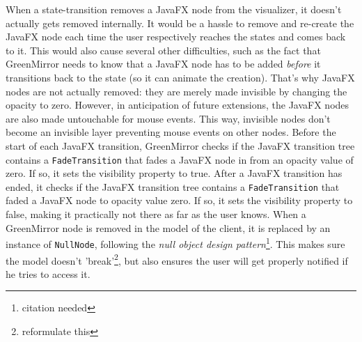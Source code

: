 \documentclass[a4paper]{article}
\begin{document}
	When a state-transition removes a JavaFX node from the visualizer, it doesn't actually gets removed internally. It would be a hassle to remove and re-create the JavaFX node each time the user respectively reaches the states and comes back to it. This would also cause several other difficulties, such as the fact that GreenMirror needs to know that a JavaFX node has to be added \emph{before} it transitions back to the state (so it can animate the creation). That's why JavaFX nodes are not actually removed: they are merely made invisible by changing the opacity to zero. However, in anticipation of future extensions, the JavaFX nodes are also made untouchable for mouse events. This way, invisible nodes don't become an invisible layer preventing mouse events on other nodes. Before the start of each JavaFX transition, GreenMirror checks if the JavaFX transition tree contains a \lstinline{FadeTransition} that fades a JavaFX node in from an opacity value of zero. If so, it sets the visibility property to true. After a JavaFX transition has ended, it checks if the JavaFX transition tree contains a \lstinline{FadeTransition} that faded a JavaFX node to opacity value zero. If so, it sets the visibility property to false, making it practically not there as far as the user knows.
	When a GreenMirror node is removed in the model of the client, it is replaced by an instance of \lstinline{NullNode}, following the \emph{null object design pattern}\footnote{citation needed}. This makes sure the model doesn't 'break'\footnote{reformulate this}, but also ensures the user will get properly notified if he tries to access it.
	
\end{document}
